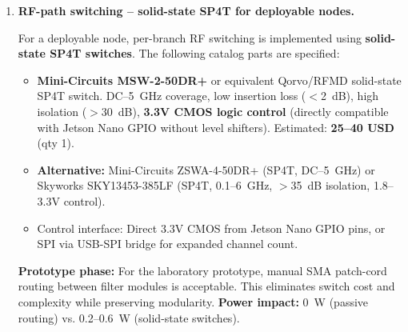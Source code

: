 \documentclass[11pt,a4paper]{article}
\newcommand{\blue}[1]{\textcolor{priceblue}{\textbf{#1}}}
\begin{document}
\begin{enumerate}[label=\roman*)]
		The RF front-end should support at least three operating modes. In the
		USRP N210-based architecture, these modes may be applied independently to each
		receive branch, depending on the target band and the measured input-power
		conditions:
		\begin{enumerate}
			\item \textbf{Wideband survey mode:} moderate gain, conservative attenuation,
			and broad preselection for spectrum-occupancy mapping across the assigned
			receive branch.
			
			\item \textbf{Protected urban mode:} FM-notch or band-limiting preselection
			enabled when appropriate, LNA bypass available, and increased attenuation to
			avoid front-end or SDR-input compression.
			
			\item \textbf{Focused band-analysis mode:} narrow preselector enabled, LNA path
			selected according to the target band, and attenuation adjusted so that the
			LNA and SDR input remain within their linear operating ranges.
		\end{enumerate}
		
		\item \textbf{RF-path switching -- solid-state SP4T for deployable nodes.}
		
		For a deployable node, per-branch RF switching is implemented using
		\textbf{solid-state SP4T switches}. The following catalog parts are specified:
		
		\begin{itemize}
			\item \textbf{Mini-Circuits MSW-2-50DR+} or equivalent Qorvo/RFMD solid-state
			SP4T switch. DC--5~GHz coverage, low insertion loss ($<$2~dB), high isolation
			($>$30~dB), \textbf{3.3V CMOS logic control} (directly compatible with Jetson
			Nano GPIO without level shifters). Estimated: \blue{25--40 USD} (qty 1).
			\item \textbf{Alternative:} Mini-Circuits ZSWA-4-50DR+ (SP4T, DC--5~GHz) or
			Skyworks SKY13453-385LF (SP4T, 0.1--6~GHz, $>$35~dB isolation, 1.8--3.3V control).
			\item Control interface: Direct 3.3V CMOS from Jetson Nano GPIO pins, or SPI
			via USB-SPI bridge for expanded channel count.
		\end{itemize}
		
		\textbf{Prototype phase:} For the laboratory prototype, manual SMA patch-cord
		routing between filter modules is acceptable. This eliminates switch cost and
		complexity while preserving modularity. \textbf{Power impact:} 0~W (passive
		routing) vs. 0.2--0.6~W (solid-state switches).
		

\end{enumerate}
\end{document}
